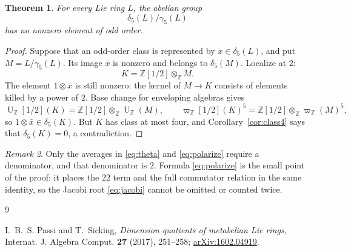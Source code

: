 \documentclass[10pt,a4paper]{amsart}
\newtheorem{theorem}{Theorem}[section]
\theoremstyle{remark}
\newtheorem{remark}[theorem]{Remark}
\newcommand{\Z}{\mathbb Z}
\newcommand{\R}{\mathbb Z[1/2]}
\newcommand{\U}{\operatorname U}
\newcommand{\aug}{\varpi}
\begin{document}
\begin{theorem}
For every Lie ring $L$, the abelian group
\[
                         \delta_5(L)/\gamma_5(L)
\]
has no nonzero element of odd order.
\end{theorem}

\begin{proof}
Suppose that an odd-order class is represented by $x\in\delta_5(L)$,
and put $M=L/\gamma_5(L)$.  Its image $\bar x$ is nonzero and belongs
to $\delta_5(M)$.  Localize at $2$:
\[
                            K=\R\otimes_\Z M.
\]
The element $1\otimes\bar x$ is still nonzero: the kernel of
$M\to K$ consists of elements killed by a power of $2$.  Base change
for enveloping algebras gives
\[
 \U_\R(K)=\R\otimes_\Z\U_\Z(M),\qquad
 \aug_\R(K)^5=\R\otimes_\Z\aug_\Z(M)^5,
\]
so $1\otimes\bar x\in\delta_5(K)$.  But $K$ has class at most four,
and Corollary~\ref{cor:class4} says that $\delta_5(K)=0$, a
contradiction.
\end{proof}

\begin{remark}
Only the averages in \eqref{eq:theta} and \eqref{eq:polarize} require
a denominator, and that denominator is $2$.  Formula
\eqref{eq:polarize} is the small point of the proof: it
places the $22$ term and the full commutator relation in the same
identity, so the Jacobi root \eqref{eq:jacobi} cannot be omitted or
counted twice.
\end{remark}

\begin{thebibliography}{9}

I.~B.~S. Passi and T.~Sicking,
\emph{Dimension quotients of metabelian Lie rings},
Internat. J. Algebra Comput. \textbf{27} (2017), 251--258;
\href{https://arxiv.org/abs/1602.04919}{arXiv:1602.04919}.

\end{thebibliography}
\end{document}
